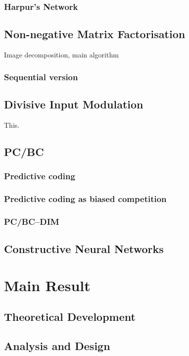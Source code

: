 \documentclass[11pt,a4paper]{report}
\begin{document}
			\subsection{Harpur's Network}
	
		\section{Non-negative Matrix Factorisation}
		Image decomposition, main algorithm
			\subsection{Sequential version}
	
		\section{Divisive Input Modulation}
		This.

		\section{PC/BC}
		\label{sec:pcbc}
			\subsection{Predictive coding}
			\subsection{Predictive coding as biased competition}
			\subsection{PC/BC--DIM}
			
		\section{Constructive Neural Networks}
		\label{sec:constructive}

	
	\chapter{Main Result}
		\section{Theoretical Development}
		\section{Analysis and Design}
\end{document}
